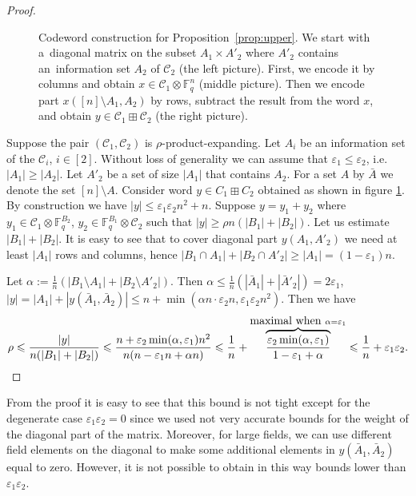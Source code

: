 \documentclass[11pt]{article}
\let\le\leqslant
\let\ge\geqslant
\newcommand{\eps}{\varepsilon}
\theoremstyle{plain}
\theoremstyle{definition}
\theoremstyle{remark}
\newcommand{\cC}{\mathcal{C}}
\newcommand{\F}{\mathbb{F}}
\begin{document}
\begin{proof}
\begin{figure}
    \caption{Codeword construction for Proposition~\ref{prop:upper}. We start with a~diagonal matrix on the subset $A_1\times A'_2$ where $A'_2$ contains an~information set $A_2$ of $\cC_2$ (the left picture). First, we encode it by columns and obtain $x\in\cC_1\otimes \F_q^n$ (middle picture). Then we encode part $x([n]\setminus A_1,A_2)$ by rows, subtract the result from the word $x$, and obtain $y\in \cC_1\boxplus \cC_2$ (the right picture). }\label{fig:prop-proof}
    \end{figure}
    Suppose the pair $(\cC_1,\cC_2)$ is $\rho$-product-expanding.    Let $A_i$ be an information set of the $\cC_i$, $i\in [2]$. Without loss of generality we can assume that $\eps_1\le\eps_2$, i.e. $|A_1|\ge |A_2|$. 
    Let $A'_2$ be a set of size $|A_1|$ that contains $A_2$. For a set $A$ by $\bar A$ we denote the set $[n]\setminus A$. 
    Consider word $y\in C_1\boxplus C_2$ obtained as shown in figure \ref{fig:prop-proof}. By construction we have $|y|\le \eps_1\eps_2n^2+n$.
    Suppose $y=y_1+y_2$ where $y_1\in \cC_1\otimes \F_q^{B_2}$, $y_2\in \F_q^{B_1}\otimes \cC_2$ such that $|y|\ge \rho n(|B_1|+|B_2|)$. Let us estimate $|B_1|+|B_2|$. It is easy to see that to cover diagonal part $y(A_1,A'_2)$ we need at least $|A_1|$ rows and columns, hence $|B_1\cap A_1|+|B_2\cap A'_2|\ge |A_1|=(1-\eps_1)n$.
    
    Let $\alpha:=\frac1n(|B_1\setminus A_1|+|B_2\setminus A'_2|)$. Then $\alpha\le \frac1n(|\bar A_1|+|\bar A'_2|)=2\eps_1$, $|y|= |A_1|+|y(\bar A_1,\bar A_2)|\le n+\min(\alpha n\cdot \eps_2 n,\eps_1\eps_2 n^2)$. Then we have 
    \[
        \rho\le \frac{|y|}{n(|B_1|+|B_2|)}\le \frac{n+\eps_2 \min(\alpha,\eps_1) n^2}{n(n-\eps_1 n+\alpha n)}\le \frac{1}{n}+\overbrace{\frac{\eps_2 \min(\alpha,\eps_1)}{1-\eps_1+\alpha}}^{\mbox{maximal when }\alpha=\eps_1}\le\frac1n +\eps_1\eps_2.\qedhere
    \]
\end{proof}

From the proof it is easy to see that this bound is not tight except for the degenerate case $\eps_1\eps_2=0$ since we used not very accurate bounds for the weight of the diagonal part of the matrix. Moreover, for large fields, we can use different field elements on the diagonal to make some additional elements in $y(\bar A_1,\bar A_2)$ equal to zero. However, it is not possible to obtain in this way bounds lower than $\eps_1\eps_2$.
\end{document}
